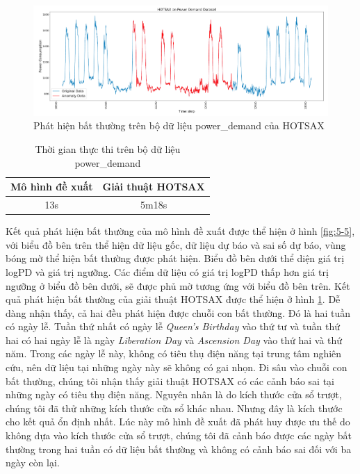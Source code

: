 \begin{figure}[H]
    \centering
    \includegraphics[scale=0.85]{./content/images/5-6.png}
    \caption{Phát hiện bất thường trên bộ dữ liệu power\_demand của HOTSAX}
    \label{fig:5-6}
\end{figure}

\begin{table}[H]
\centering
\begin{tabular}{|c|c|}
\hline
\textbf{Mô hình đề xuất} & \textbf{Giải thuật HOTSAX}  \\
\hline
13s                      & 5m18s                      \\
\hline
\end{tabular}
\caption{Thời gian thực thi trên bộ dữ liệu power\_demand}
\label{tab:5-3}
\end{table}

Kết quả phát hiện bất thường của mô hình đề xuất được thể hiện ở hình \ref{fig:5-5}, với biểu đồ bên trên thể hiện dữ liệu gốc, dữ liệu dự báo và sai số dự báo, vùng bóng mờ thể hiện bất thường được phát hiện. Biểu đồ bên dưới thể diện giá trị logPD và giá trị ngưỡng. Các điểm dữ liệu có giá trị logPD thấp hơn giá trị ngưỡng ở biểu đồ bên dưới, sẽ được phủ mờ tương ứng với biểu đồ bên trên. Kết quả phát hiện bất thường của giải thuật HOTSAX được thể hiện ở hình \ref{fig:5-6}. Dễ dàng nhận thấy, cả hai đều phát hiện được chuỗi con bất thường. Đó là hai tuần có ngày lễ. Tuần thứ nhất có ngày lễ \textit{Queen’s Birthday} vào thứ tư và tuần thứ hai có hai ngày lễ là ngày \textit{Liberation Day} và \textit{Ascension Day} vào thứ hai và thứ năm. Trong các ngày lễ này, không có tiêu thụ điện năng tại trung tâm nghiên cứu, nên dữ liệu tại những ngày này sẽ không có gai nhọn. Đi sâu vào chuỗi con bất thường, chúng tôi nhận thấy giải thuật HOTSAX có các cảnh báo sai tại những ngày có tiêu thụ điện năng. Nguyên nhân là do kích thước cửa sổ trượt, chúng tôi đã thử những kích thước cửa sổ khác nhau. Nhưng đây là kích thước cho kết quả ổn định nhất. Lúc này mô hình đề xuất đã phát huy được ưu thế do không dựa vào kích thước cửa sổ trượt, chúng tôi đã cảnh báo được các ngày bất thường trong hai tuần có dữ liệu bất thường và không có cảnh báo sai đối với ba ngày còn lại. 

